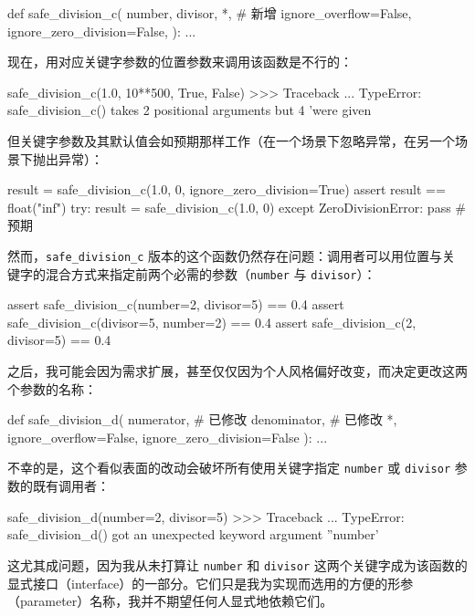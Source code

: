 \begin{codebox}[python]
def safe_division_c(
    number,
    divisor,
    *,  # 新增
    ignore_overflow=False,
    ignore_zero_division=False,
):
    ...
\end{codebox}

现在，用对应关键字参数的位置参数来调用该函数是不行的：

\begin{codebox}[python]
safe_division_c(1.0, 10**500, True, False)
>>>
Traceback ...
TypeError: safe_division_c() takes 2 positional arguments but 4
'were given
\end{codebox}

但关键字参数及其默认值会如预期那样工作（在一个场景下忽略异常，在另一个场景下抛出异常）：

\begin{codebox}[python]
result = safe_division_c(1.0, 0, ignore_zero_division=True)
assert result == float("inf")
try:
    result = safe_division_c(1.0, 0)
except ZeroDivisionError:
    pass  # 预期
\end{codebox}

然而，\texttt{safe\_division\_c} 版本的这个函数仍然存在问题：调用者可以用位置与关键字的混合方式来指定前两个必需的参数（\texttt{number} 与 \texttt{divisor}）：

\begin{codebox}[python]
assert safe_division_c(number=2, divisor=5) == 0.4
assert safe_division_c(divisor=5, number=2) == 0.4
assert safe_division_c(2, divisor=5) == 0.4
\end{codebox}

之后，我可能会因为需求扩展，甚至仅仅因为个人风格偏好改变，而决定更改这两个参数的名称：

\begin{codebox}[python]
def safe_division_d(
    numerator,    # 已修改
    denominator,  # 已修改
    *,
    ignore_overflow=False,
    ignore_zero_division=False
):
    ...
\end{codebox}

不幸的是，这个看似表面的改动会破坏所有使用关键字指定 \texttt{number} 或 \texttt{divisor} 参数的既有调用者：

\begin{codebox}[python]
safe_division_d(number=2, divisor=5)
>>>
Traceback ...
TypeError: safe_division_d() got an unexpected keyword argument
''number'
\end{codebox}

这尤其成问题，因为我从未打算让 \texttt{number} 和 \texttt{divisor} 这两个关键字成为该函数的显式接口（interface）的一部分。它们只是我为实现而选用的方便的形参（parameter）名称，我并不期望任何人显式地依赖它们。

